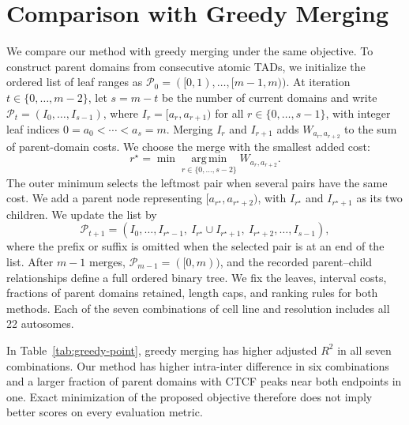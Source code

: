 \section{Comparison with Greedy Merging}
\label{ssec:greedy-comparison}

We compare our method with greedy merging under the same objective.
To construct parent domains from consecutive atomic TADs, we initialize the ordered list of leaf ranges as $\mathcal P_0=([0,1),\ldots,[m-1,m))$.
At iteration $t\in\{0,\ldots,m-2\}$, let $s=m-t$ be the number of current domains and write $\mathcal P_t=(I_0,\ldots,I_{s-1})$, where $I_r=[a_r,a_{r+1})$ for all $r\in\{0,\ldots,s-1\}$, with integer leaf indices $0=a_0<\cdots<a_s=m$.
Merging $I_r$ and $I_{r+1}$ adds $W_{a_r,a_{r+2}}$ to the sum of parent-domain costs.
We choose the merge with the smallest added cost:
\[
 r^\star=\min\operatorname*{arg\,min}_{r\in\{0,\ldots,s-2\}}W_{a_r,a_{r+2}}.
\]
The outer minimum selects the leftmost pair when several pairs have the same cost.
We add a parent node representing $[a_{r^\star},a_{r^\star+2})$, with $I_{r^\star}$ and $I_{r^\star+1}$ as its two children.
We update the list by
\[
 \mathcal P_{t+1}=(I_0,\ldots,I_{r^\star-1},\ I_{r^\star}\cup I_{r^\star+1},\ I_{r^\star+2},\ldots,I_{s-1}),
\]
where the prefix or suffix is omitted when the selected pair is at an end of the list.
After $m-1$ merges, $\mathcal P_{m-1}=([0,m))$, and the recorded parent--child relationships define a full ordered binary tree.
We fix the leaves, interval costs, fractions of parent domains retained, length caps, and ranking rules for both methods.
Each of the seven combinations of cell line and resolution includes all 22 autosomes.

In Table~\ref{tab:greedy-point}, greedy merging has higher adjusted $R^2$ in all seven combinations.
Our method has higher intra-inter difference in six combinations and a larger fraction of parent domains with CTCF peaks near both endpoints in one.
Exact minimization of the proposed objective therefore does not imply better scores on every evaluation metric.


